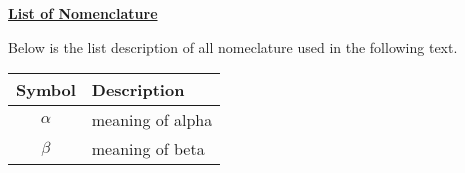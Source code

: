 \begin{center}
\underline{\textbf{List of Nomenclature}}
\end{center}

Below is the list description of all nomeclature used in the following text.
\\
\begin{center}
	\begin{tabular}{ c | l }
		Symbol & Description \\
		\hline\hline
		$\alpha$ & meaning of alpha\\
		$\beta$ & meaning of beta\\
		\hline\hline
	\end{tabular}
\end{center}